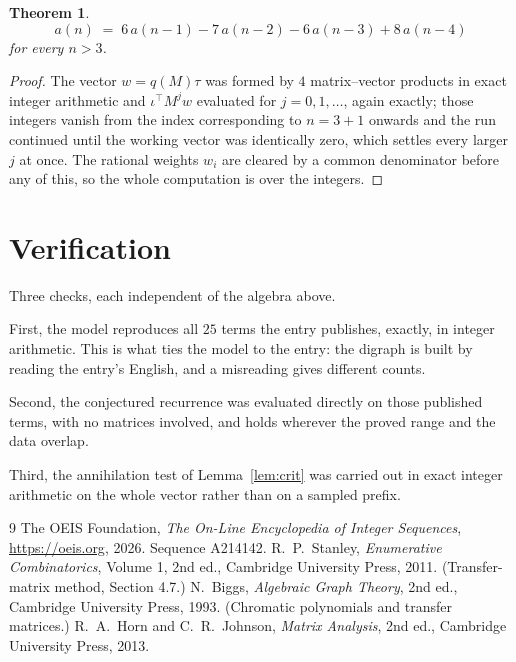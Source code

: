 \documentclass[11pt,a4paper]{article}
\theoremstyle{plain}
\newtheorem{theorem}{Theorem}
\theoremstyle{definition}
\begin{document}
\begin{theorem}
\[
a(n)\;=\;6\,a(n-1) - 7\,a(n-2) - 6\,a(n-3) + 8\,a(n-4)
\]
for every $n>3$.
\end{theorem}

\begin{proof}
The vector $w=q(M)\tau$ was formed by $4$ matrix--vector products in exact integer
arithmetic and $\iota^{\!\top}M^{j}w$ evaluated for $j=0,1,\dots$, again exactly; those
integers vanish from the index corresponding to $n=3+1$ onwards and the run continued
until the working vector was identically zero, which settles every larger $j$ at once. The
rational weights $w_i$ are cleared by a common denominator before any of this, so the whole
computation is over the integers.
\end{proof}

\section{Verification}

Three checks, each independent of the algebra above.

First, the model reproduces all $25$ terms the entry publishes, exactly, in integer
arithmetic. This is what ties the model to the entry: the digraph is built by reading the
entry's English, and a misreading gives different counts.

Second, the conjectured recurrence was evaluated directly on those published terms, with no
matrices involved, and holds wherever the proved range and the data overlap.

Third, the annihilation test of Lemma~\ref{lem:crit} was carried out in exact integer
arithmetic on the whole vector rather than on a sampled prefix.

\begin{thebibliography}{9}
 The OEIS Foundation, \emph{The On-Line Encyclopedia of Integer
Sequences}, \url{https://oeis.org}, 2026. Sequence A214142.
 R.~P.~Stanley, \emph{Enumerative Combinatorics}, Volume 1, 2nd ed.,
Cambridge University Press, 2011. (Transfer-matrix method, Section 4.7.)
 N.~Biggs, \emph{Algebraic Graph Theory}, 2nd ed., Cambridge University
Press, 1993. (Chromatic polynomials and transfer matrices.)
 R.~A.~Horn and C.~R.~Johnson, \emph{Matrix Analysis}, 2nd ed., Cambridge
University Press, 2013.
\end{thebibliography}
\end{document}
